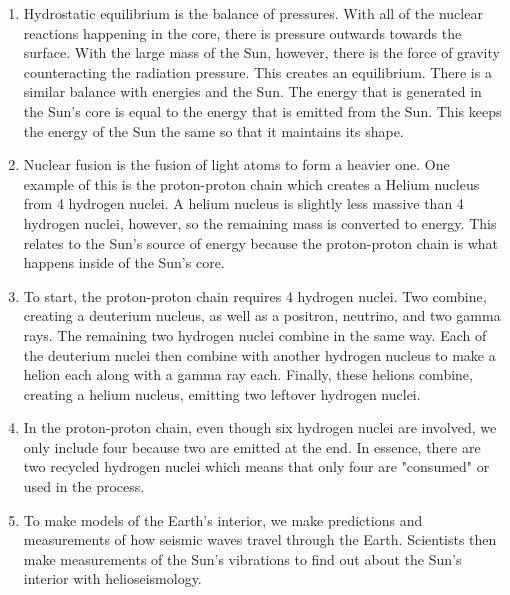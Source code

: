 \documentclass[../hw2.tex]{subfiles}
\begin{document}
    \begin{enumerate}
        \item Hydrostatic equilibrium is the balance of pressures. With all of the nuclear reactions happening in the core, there is pressure outwards towards the surface. With the large mass of the Sun, however, there is the force of gravity counteracting the radiation pressure. This creates an equilibrium. There is a similar balance with energies and the Sun. The energy that is generated in the Sun's core is equal to the energy that is emitted from the Sun. This keeps the energy of the Sun the same so that it maintains its shape. 
        \item Nuclear fusion is the fusion of light atoms to form a heavier one. One example of this is the proton-proton chain which creates a Helium nucleus from 4 hydrogen nuclei. A helium nucleus is slightly less massive than 4 hydrogen nuclei, however, so the remaining mass is converted to energy. This relates to the Sun's source of energy because the proton-proton chain is what happens inside of the Sun's core.
        \item To start, the proton-proton chain requires 4 hydrogen nuclei. Two combine, creating a deuterium nucleus, as well as a positron, neutrino, and two gamma rays. The remaining two hydrogen nuclei combine in the same way. Each of the deuterium nuclei then combine with another hydrogen nucleus to make a helion each along with a gamma ray each. Finally, these helions combine, creating a helium nucleus, emitting two leftover hydrogen nuclei.
        \item In the proton-proton chain, even though six hydrogen nuclei are involved, we only include four because two are emitted at the end. In essence, there are two recycled hydrogen nuclei which means that only four are "consumed" or used in the process.
        \item To make models of the Earth's interior, we make predictions and measurements of how seismic waves travel through the Earth. Scientists then make measurements of the Sun's vibrations to find out about the Sun's interior with helioseismology. 
    \end{enumerate}
\end{document}
